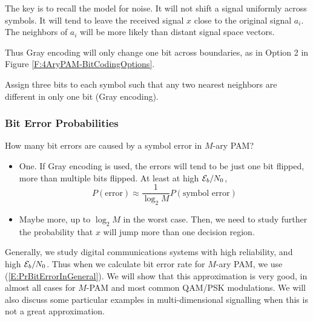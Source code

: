 The key is to recall the model for noise.  It will not shift a
signal uniformly across symbols.  It will tend to leave the received
signal $x$ close to the original signal $a_i$.  The neighbors of
$a_i$ will be more likely than distant signal space vectors.

Thus Gray encoding will only change one bit across boundaries, as in
Option 2 in Figure \ref{F:4AryPAM-BitCodingOptions}.

  Assign three bits to each
symbol such that any two nearest neighbors are different in only one
bit (Gray encoding).


\subsubsection{Bit Error Probabilities}

How many bit errors are caused by a symbol error in $M$-ary PAM?
\begin{itemize}
  \item One.  If Gray encoding is used, the errors will tend to be
  just one bit flipped, more than multiple bits flipped.  At least
  at high $\mathcal{E}_b/N_0$,
  \begin{equation} \label{E:PrBitErrorInGeneral}
    P(\mbox{error}) \approx \frac{1}{\log_2 M} P(\mbox{symbol error})
  \end{equation}
  \item Maybe more, up to $\log_2 M$ in the worst case.  Then, we
  need to study further the probability that $x$ will jump more than one decision
  region.
\end{itemize}
Generally, we study digital communications systems with high reliability, and high $\mathcal{E}_b/N_0$.  Thus when we calculate bit error rate for $M$-ary PAM, we
use (\ref{E:PrBitErrorInGeneral}).  We will show that this approximation is very good, in almost all cases for $M$-PAM and most common QAM/PSK modulations.  We will also discuss some particular examples in multi-dimensional signalling when this is not a great approximation.


